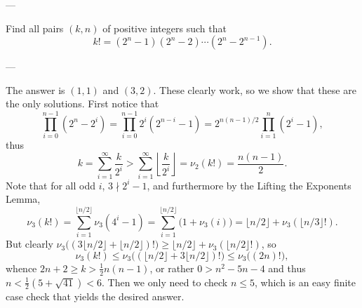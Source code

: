 
---

Find all pairs $(k,n)$ of positive integers such that \[k!=(2^n-1)(2^n-2)\cdots(2^n-2^{n-1}).\]

---

The answer is $(1,1)$ and $(3,2)$. These clearly work, so we show that these are the only solutions. First notice that \[\prod_{i=0}^{n-1}\left(2^n-2^i\right)=\prod_{i=0}^{n-1}2^i\left(2^{n-i}-1\right)=2^{n(n-1)/2}\prod_{i=1}^n\left(2^i-1\right),\]
thus \[k=\sum_{i=1}^\infty\frac k{2^i}>\sum_{i=1}^\infty\left\lfloor\frac k{2^i}\right\rfloor=\nu_2(k!)=\frac{n(n-1)}2.\]
Note that for all odd $i$, $3\nmid2^i-1$, and furthermore by the Lifting the Exponents Lemma, \[\nu_3(k!)=\sum_{i=1}^{\lfloor n/2\rfloor}\nu_3\left(4^i-1\right)=\sum_{i=1}^{\lfloor n/2\rfloor}\Big(1+\nu_3(i)\Big)=\lfloor n/2\rfloor+\nu_3\left(\lfloor n/3\rfloor!\right).\]
But clearly $\nu_3\big((3\lfloor n/2\rfloor+\lfloor n/2\rfloor)!\big)\ge\lfloor n/2\rfloor+\nu_3(\lfloor n/2\rfloor!)$, so \[\nu_3(k!)\le\nu_3\big((\lfloor n/2\rfloor+3\lfloor n/2\rfloor)!\big)\le\nu_3\big((2n)!\big),\]
whence $2n+2\ge k>\tfrac12n(n-1)$, or rather $0>n^2-5n-4$ and thus $n<\tfrac12(5+\sqrt{41})<6$. Then we only need to check $n\le5$, which is an easy finite case check that yields the desired answer.

